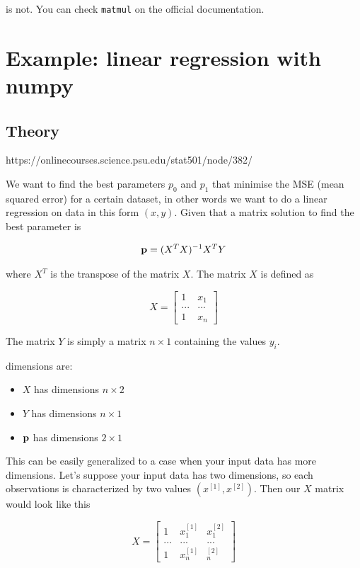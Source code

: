 \documentclass[11pt]{article}
\providecommand{\tightlist}{%
      \setlength{\itemsep}{0pt}\setlength{\parskip}{0pt}}
\begin{document}
    is not. You can check \texttt{matmul} on the official documentation.

    \section{Example: linear regression with
numpy}\label{example-linear-regression-with-numpy}

    \subsection{Theory}\label{theory}

    https://onlinecourses.science.psu.edu/stat501/node/382/

    We want to find the best parameters \(p_0\) and \(p_1\) that minimise
the MSE (mean squared error) for a certain dataset, in other words we
want to do a linear regression on data in this form \((x,y)\). Given
that a matrix solution to find the best parameter is

\[
{\bf p} =(X^TX)^{-1} X^T Y
\]

where \(X^T\) is the transpose of the matrix \(X\). The matrix \(X\) is
defined as

\[
X = 
\begin{bmatrix}
1 & x_1  \\
... &  ...  \\
1 &  x_n 
\end{bmatrix}
\]

The matrix \(Y\) is simply a matrix \(n\times 1\) containing the values
\(y_i\).

dimensions are:

\begin{itemize}
\tightlist
\item
  \(X\) has dimensions \(n\times 2\)
\item
  \(Y\) has dimensions \(n\times 1\)
\item
  \({\bf p}\) has dimensions \(2\times 1\)
\end{itemize}

    This can be easily generalized to a case when your input data has more
dimensions. Let's suppose your input data has two dimensions, so each
observations is characterized by two values \((x^{[1]}, x^{[2]})\). Then
our \(X\) matrix would look like this

\[
X = 
\begin{bmatrix}
1 & x^{[1]}_1 & x^{[2]}_1 \\
... &  ...  & ... \\
1 &  x^{[1]}_n & ^{[2]}_n
\end{bmatrix}
\]
\end{document}
